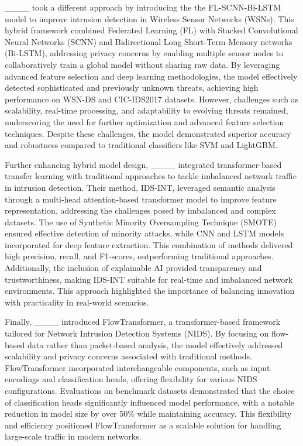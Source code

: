 ____ took a different approach by introducing the the FL-SCNN-Bi-LSTM model to improve intrusion detection in Wireless Sensor Networks (WSNs). This hybrid framework combined Federated Learning (FL) with Stacked Convolutional Neural Networks (SCNN) and Bidirectional Long Short-Term Memory networks (Bi-LSTM), addressing privacy concerns by enabling multiple sensor nodes to collaboratively train a global model without sharing raw data. By leveraging advanced feature selection and deep learning methodologies, the model effectively detected sophisticated and previously unknown threats, achieving high performance on WSN-DS and CIC-IDS2017 datasets. However, challenges such as scalability, real-time processing, and adaptability to evolving threats remained, underscoring the need for further optimization and advanced feature selection techniques. Despite these challenges, the model demonstrated superior accuracy and robustness compared to traditional classifiers like SVM and LightGBM.

Further enhancing hybrid model design, ____ integrated transformer-based transfer learning with traditional approaches to tackle imbalanced network traffic in intrusion detection. Their method, IDS-INT, leveraged semantic analysis through a multi-head attention-based transformer model to improve feature representation, addressing the challenges posed by imbalanced and complex datasets. The use of Synthetic Minority Oversampling Technique (SMOTE) ensured effective detection of minority attacks, while CNN and LSTM models incorporated for deep feature extraction. This combination of methods delivered high precision, recall, and F1-scores, outperforming traditional approaches. Additionally, the inclusion of explainable AI provided transparency and trustworthiness, making IDS-INT suitable for real-time and imbalanced network environments. This approach highlighted the importance of balancing innovation with practicality in real-world scenarios.

Finally, ____ introduced FlowTransformer, a transformer-based framework tailored for Network Intrusion Detection Systems (NIDS). By focusing on flow-based data rather than packet-based analysis, the model effectively addressed scalability and privacy concerns associated with traditional methods. FlowTransformer incorporated interchangeable components, such as input encodings and classification heads, offering flexibility for various NIDS configurations. Evaluations on benchmark datasets demonstrated that the choice of classification heads significantly influenced model performance, with a notable reduction in model size by over 50\% while maintaining accuracy. This flexibility and efficiency positioned FlowTransformer as a scalable solution for handling large-scale traffic in modern networks.

